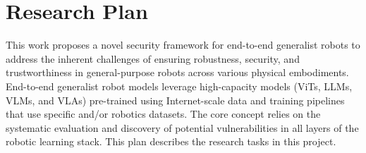 \newpage
\section{Research Plan}

This work proposes a novel security framework for end-to-end generalist robots to address the inherent challenges of ensuring robustness, security, and trustworthiness in general-purpose robots across various physical embodiments. 
End-to-end generalist robot models leverage high-capacity models (\eg ViTs, LLMs, VLMs, and VLAs) pre-trained using Internet-scale data and training pipelines that use specific and/or \xot robotics datasets. 
The core concept relies on the systematic evaluation and discovery of potential vulnerabilities in all layers of the robotic learning stack. This plan describes the research tasks in this project.


